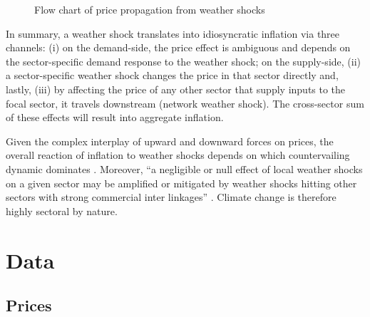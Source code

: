 \documentclass[
  letterpaper,
  DIV=11,
  numbers=noendperiod]{scrartcl}
\begin{document}
\begin{figure}[h]


\caption{\label{fig-flowchart}Flow chart of price propagation from
weather shocks}

\end{figure}%

In summary, a weather shock translates into idiosyncratic inflation via
three channels: (i) on the demand-side, the price effect is ambiguous
and depends on the sector-specific demand response to the weather shock;
on the supply-side, (ii) a sector-specific weather shock changes the
price in that sector directly and, lastly, (iii) by affecting the price
of any other sector that supply inputs to the focal sector, it travels
downstream (network weather shock). The cross-sector sum of these
effects will result into aggregate inflation.

Given the complex interplay of upward and downward forces on prices, the
overall reaction of inflation to weather shocks depends on which
countervailing dynamic dominates \citep{parker2018}. Moreover, ``a
negligible or null effect of local weather shocks on a given sector may
be amplified or mitigated by weather shocks hitting other sectors with
strong commercial inter linkages'' \citep{zappala2024}. Climate change
is therefore highly sectoral by nature.

\section{Data}\label{data}

\subsection{Prices}\label{prices}
\end{document}
